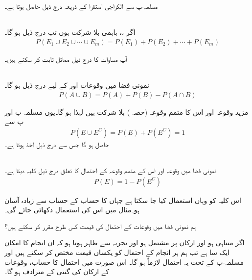 مسلمہ-پ سے الکراجی استقرا کے ذریعہ درج ذیل حاصل ہوتا ہے۔

\quad {}\\
اگر ،،  باہمی بلا شرکت ہوں تب درج ذیل ہو گا۔
\begin{align}
P(E_1\cup E_2\cup \cdots \cup E_m)=P(E_1)+P(E_2)+\cdots+P(E_m)
\end{align}

آپ مساوات  کا درج ذیل مماثل  ثابت کر سکتے ہیں۔

\quad {}\\
نمونی فضا  میں وقوعات  اور  کے لیے درج ذیل ہو گا۔
\begin{align}
P(A\cup B)=P(A)+P(B)-P(A\cap B)
\end{align}

مزید وقوعہ  اور اس کا متمم وقوعہ  (حصہ ) بلا شرکت ہیں لہٰذا  ہو گا۔یوں مسلمہ-ب اور پ سے 
\begin{align*}
P(E\cup E^C)=P(E)+P(E^C)=1
\end{align*}
حاصل ہو گا جس سے درج ذیل اخذ ہوتا ہے۔

\quad {}\\
نمونی فضا  میں وقوعہ  اور اس کے متمم وقوعہ  کے احتمال کا تعلق درج ذیل کلیہ دیتا ہے۔
\begin{align}
P(E)=1-P(E^C)
\end{align}  

اس کلیہ کو وہاں استعمال کیا جا سکتا ہے جہاں  کا حساب  کے حساب سے زیادہ آسان ہو۔مثال  میں اس کی استعمال دکھائی جائے گی۔

ہم نمونی فضا  میں وقوعات کے احتمال کی قیمت کس طرح مقرر کر سکتے ہیں؟

اگر  متناہی ہو اور  ارکان پر مشتمل ہو اور تجربہ سے ظاہر ہوتا ہو کہ ان  انجام کا امکان ایک سا  ہے تب ہم ہر انجام کے احتمال کو  یکساں قیمت مختص کر سکتے ہیں اور مسلمہ-ب کے تحت یہ احتمال لازماً  ہو گا۔ اس صورت میں احتمال کا حساب، وقوعات کے ارکان کی گنتی کے مترادف ہو گا۔

